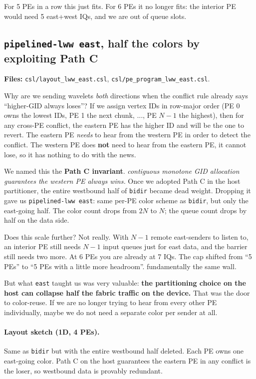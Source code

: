 \documentclass[11pt]{article}
\newcommand{\code}[1]{\texttt{#1}}
\newcommand{\file}[1]{\texttt{#1}}
\begin{document}
For 5 PEs in a row this just fits. For 6 PEs it no longer fits:
the interior PE would need 5 east+west IQs, and we are out of
queue slots.

\subsection{\code{pipelined-lww east}, half the colors by exploiting Path C}
\textbf{Files:} \file{csl/layout\_lww\_east.csl},
\file{csl/pe\_program\_lww\_east.csl}.

Why are we sending wavelets \emph{both} directions when the
conflict rule already says ``higher-GID always loses''? If we
assign vertex IDs in row-major order (PE 0 owns the lowest IDs,
PE 1 the next chunk, ..., PE $N{-}1$ the highest), then for any
cross-PE conflict, the eastern PE has the higher ID and will be
the one to revert. The eastern PE \emph{needs} to hear from the
western PE in order to detect the conflict. The western PE does
\textbf{not} need to hear from the eastern PE, it cannot
lose, so it has nothing to do with the news.

We named this the \textbf{Path C invariant}.
\emph{contiguous monotone GID allocation guarantees the western
PE always wins.} Once we adopted Path C in the host partitioner,
the entire westbound half of \code{bidir} became dead weight.
Dropping it gave us \code{pipelined-lww east}: same per-PE color
scheme as \code{bidir}, but only the east-going half. The color
count drops from $2N$ to $N$; the queue count drops by half on
the data side.

Does this scale further? Not really. With $N{-}1$ remote
east-senders to listen to, an interior PE still needs $N{-}1$
input queues just for east data, and the barrier still needs two
more. At 6 PEs you are already at 7 IQs. The cap shifted from
``5 PEs'' to ``5 PEs with a little more headroom''.
fundamentally the same wall.

But what \code{east} taught us was very valuable: \textbf{the
partitioning choice on the host can collapse half the fabric
traffic on the device.} That was the door to color-reuse. If we
are no longer trying to hear from every other PE individually,
maybe we do not need a separate color per sender at all.

\paragraph{Layout sketch (1D, 4 PEs).}
Same as \code{bidir} but with the entire westbound half deleted.
Each PE owns one east-going color. Path C on the host guarantees
the eastern PE in any conflict is the loser, so westbound data
is provably redundant.
\end{document}
